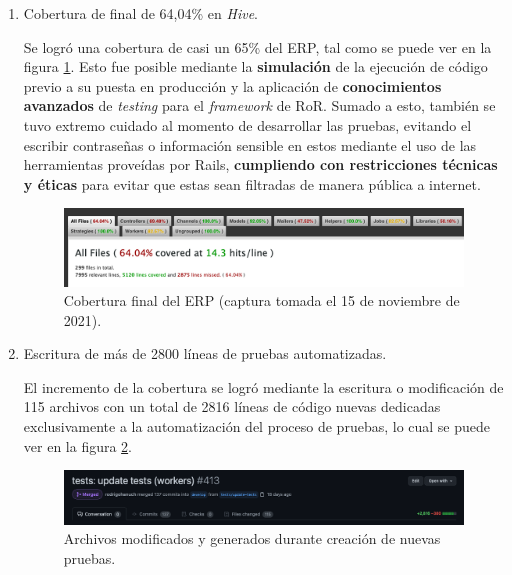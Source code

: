   \begin{enumerate}
    \item Cobertura de final de 64,04\% en \textit{Hive}.
    
    Se logró una cobertura de casi un 65\% del ERP, tal como se puede ver en la figura \ref{fig:testing_final}. Esto fue posible mediante la \textbf{simulación} de la ejecución de código previo a su puesta en producción y la aplicación de \textbf{conocimientos avanzados} de \textit{testing} para el \textit{framework} de RoR. Sumado a esto, también se tuvo extremo cuidado al momento de desarrollar las pruebas, evitando el escribir contraseñas o información sensible en estos mediante el uso de las herramientas proveídas por Rails, \textbf{cumpliendo con restricciones técnicas y éticas} para evitar que estas sean filtradas de manera pública a internet.
    
    \begin{figure}[H]
      \centering
      \includegraphics[width=\linewidth]{figures/testing/testing_final.png}
      \caption{Cobertura final del ERP (captura tomada el 15 de noviembre de 2021).}
      \label{fig:testing_final}
    \end{figure}

    \item Escritura de más de 2800 líneas de pruebas automatizadas.
    
    El incremento de la cobertura se logró mediante la escritura o modificación de 115 archivos con un total de 2816 líneas de código nuevas dedicadas exclusivamente a la automatización del proceso de pruebas, lo cual se puede ver en la figura \ref{fig:testing_file_commits}.

    \begin{figure}[H]
      \centering
      \includegraphics[width=\linewidth]{figures/testing/testing_file_commits.png}
      \caption{Archivos modificados y generados durante creación de nuevas pruebas.}
      \label{fig:testing_file_commits}
    \end{figure}


\end{enumerate}
